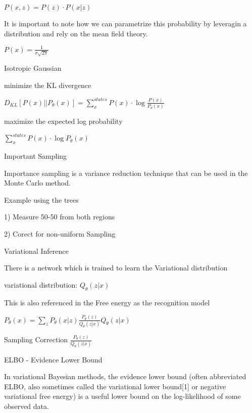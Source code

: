 \documentclass{amsart}
\begin{document}
$P(x,z) = P(z) \cdot P(x|z) $

It is important to note how we can parametrize this probability by leveragin a distribution and rely on the mean field theory.

$P(x) = \frac{1}{\sigma\sqrt{2\pi}}$

\vspace{0.4 cm}

Isotropic Gaussian \vspace{0.2 cm}

minimize the KL divergence

$D_{KL}[P(x) || P_{\theta}(x)] = \sum\limits_{x}^{states}P(x)\cdot \log\frac{P(x)}{P_{\theta}(x)}$

maximize the expected log probability

$\sum\limits_{x}^{states}P(x)\cdot \log P_{\theta}(x) $

\vspace{0.4 cm}

Important Sampling \vspace{0.2 cm}

Importance sampling is a variance reduction technique that can be used in the Monte Carlo method. 


Example using the trees

1) Measure 50-50 from both regions

2) Corect for non-uniform Sampling

\vspace{0.4 cm}

Variational Inference \vspace{0.2 cm}

There is a network which is trained to learn the Variational distribution

variational distribution: $Q_{\theta}(z|x)$

This is also referenced in the Free energy as the recognition model

$P_{\theta}(x) = \sum\limits_{z}P_{\theta}(x|z)\frac{P_{\theta}(z)}{Q_{\theta}(z|x)}Q_{\theta}(z|x) $

Sampling Correction $\frac{P_{\theta}(z)}{Q_{\theta}(z|x)}$

\vspace{0.4 cm}

ELBO - Evidence Lower Bound \vspace{0.2 cm}

In variational Bayesian methods, the evidence lower bound (often abbreviated ELBO, also sometimes called the variational lower bound[1] or negative variational free energy) is a useful lower bound on the log-likelihood of some observed data. \vspace{0.2 cm}
\end{document}
